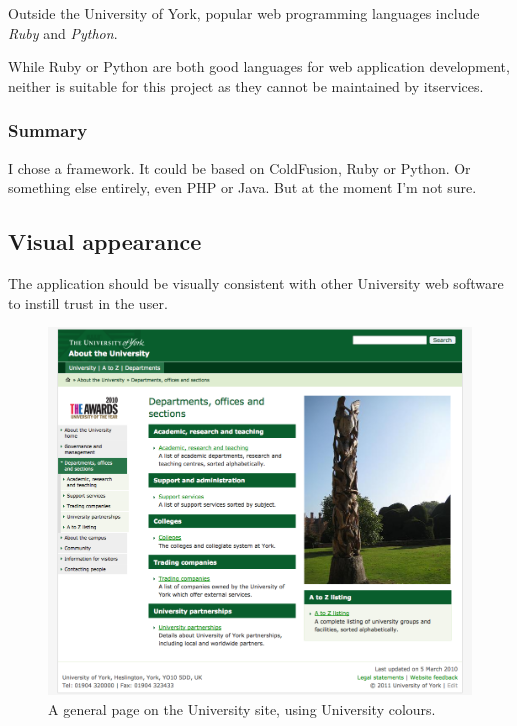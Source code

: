 \documentclass[]{scrartcl}
\begin{document}

Outside the University of York, popular web programming languages include
\emph{Ruby} and \emph{Python}.

% 
% 

While Ruby or Python are both good languages for web application development,
neither is suitable for this project as they cannot be maintained by
\gls{itservices}.

\subsubsection{Summary}

I chose a framework. It could be based on ColdFusion, Ruby or Python. Or
something else entirely, even PHP or Java. But at the moment I'm not sure.

\subsection{Visual appearance}

The application should be visually consistent with other University web
software to instill trust in the user.

\begin{figure}
  \begin{center}
    \includegraphics[width=160mm]{images/2011_11_06_yorkacuk.png}
  \end{center}
  \caption{A general page on the University site, using University colours.}
  \label{yorkacuk_general_page}
\end{figure}
\end{document}
